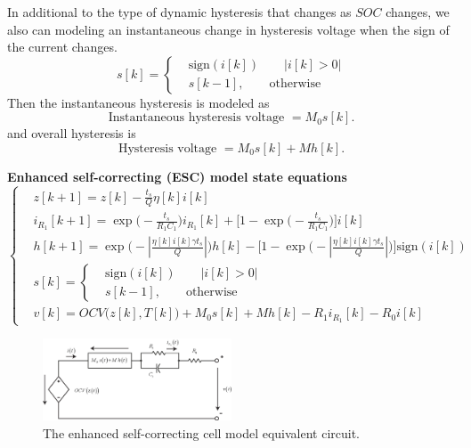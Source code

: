 \documentclass[11pt,a4paper]{article}
\numberwithin{equation}{section}
\newcommand{\abs}[1]{\left|#1\right|}
\newcommand{\sign}{\text{sign}}
\theoremstyle{it}
\theoremstyle{definition}
\begin{document}
In additional to the type of dynamic hysteresis that changes as $SOC$ changes, we also can modeling an instantaneous change in hysteresis voltage when the sign of the current changes.
\begin{equation}
	s[k]=\left\lbrace \begin{aligned}
		&\sign(i[k]) \qquad\abs{i[k]>0} \\[6pt]
		&s[k-1], \qquad\text{otherwise}
	\end{aligned}\right. 
\end{equation}
Then the instantaneous hysteresis is modeled as
\begin{equation}
	\text{Instantaneous hysteresis voltage } = M_0s[k].
\end{equation}
and overall hysteresis is
\begin{equation}
	\text{Hysteresis voltage } = M_0s[k] + Mh[k].
\end{equation}

\begin{mybox}
	\textbf{Enhanced self-correcting (ESC) model state equations}
\begin{equation}\label{lithium_ion_battery_model}
	\left\lbrace \begin{aligned}
		&	z[k+1] =z[k] -\frac{t_s}{Q}\eta[k]i[k] \\[6pt]
		&	i_{R_1}[k+1] = \exp\Big(-\frac{t_s}{R_1C_1}\Big)i_{R_1}[k]+\Big[1-\exp\Big(-\frac{t_s}{R_1C_1}\Big)\Big]i[k] \\[6pt]
		&	h[k+1] = \exp\Bigg(-\abs{\frac{\eta[k]i[k]\gamma t_s}{Q}}\Bigg)h[k] - \Bigg[1-\exp\Bigg(-\abs{\frac{\eta[k]i[k]\gamma t_s}{Q}}\Bigg)\Bigg]\sign(i[k]) \\[6pt]
		&	s[k]= \left\lbrace 
			\begin{aligned}
				& \sign(i[k]) \qquad\abs{i[k]>0} \\[6pt]
				& s[k-1], \qquad\text{otherwise}
			\end{aligned}\right.  \\[6pt]
		&	v[k] = OCV\Big(z[k],T[k]\Big)+ M_0 s[k] + M h[k] -R_1i_{R_1}[k] - R_0i[k]
	\end{aligned}\right. 
\end{equation}

\begin{figure}[H]
	\centering
	\includegraphics[width = 0.5\textwidth, width = 360pt, angle = 0, keepaspectratio]{figures/lithium_ion_battery/cell_eq_circuit_4.eps}
	\captionsetup{width=0.5\textwidth}		
	\caption{The enhanced self-correcting cell model equivalent circuit.}
	\label{ocv_soc_5}
\end{figure}
\end{mybox}
\end{document}
